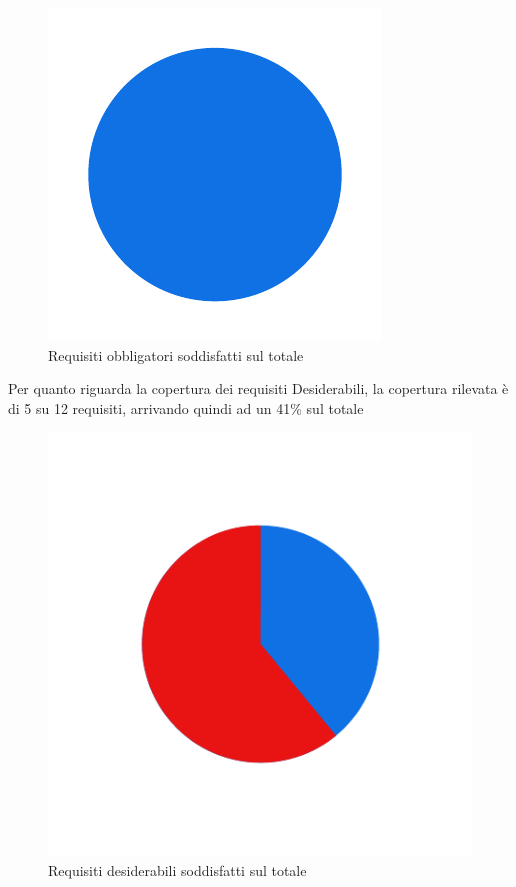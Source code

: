 \begin{figure}[H]
    \centering
    \includegraphics[width=\textwidth]{images/requisiti_o.png}
    \caption{Requisiti obbligatori soddisfatti sul totale}
    \label{fig:Requisiti Obbligatori}
\end{figure}

\newpage

Per quanto riguarda la copertura dei requisiti Desiderabili, la copertura rilevata è di 5 su 12
requisiti, arrivando quindi ad un 41\% sul totale
\begin{figure}[H]
    \centering
    \includegraphics[width=\textwidth]{images/requisiti_d.png}
    \caption{Requisiti desiderabili soddisfatti sul totale}
    \label{fig:Requisiti Desiderabili}
\end{figure}

